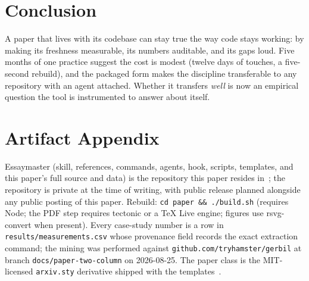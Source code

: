 \documentclass{article}
\begin{document}
\section{Conclusion}
\label{sec:conclusion}
A paper that lives with its codebase can stay true the way code stays working: by
making its freshness measurable, its numbers auditable, and its gaps loud. Five
months of one practice suggest the cost is modest (twelve days of touches, a
five-second rebuild), and the packaged form makes the discipline transferable to
any repository with an agent attached. Whether it transfers \emph{well} is now an
empirical question the tool is instrumented to answer about itself.



\appendix
\section{Artifact Appendix}
\label{sec:artifact}
Essaymaster (skill, references, commands, agents, hook, scripts, templates, and this
paper's full source and data) is the repository this paper resides
in~\citep{essaymaster}; the repository is private at the time of writing, with public
release planned alongside any public posting of this paper. Rebuild: \texttt{cd paper \&\& ./build.sh} (requires Node;
the PDF step requires tectonic or a TeX Live engine; figures use rsvg-convert when
present). Every case-study number is a row in \texttt{results/measurements.csv}
whose provenance field records the exact extraction command; the mining was performed
against \texttt{github.com/tryhamster/gerbil} at branch \texttt{docs/paper-two-column}
on 2026-08-25. The paper class is the MIT-licensed \texttt{arxiv.sty} derivative
shipped with the templates~\citep{arxivstyle}.
\end{document}
